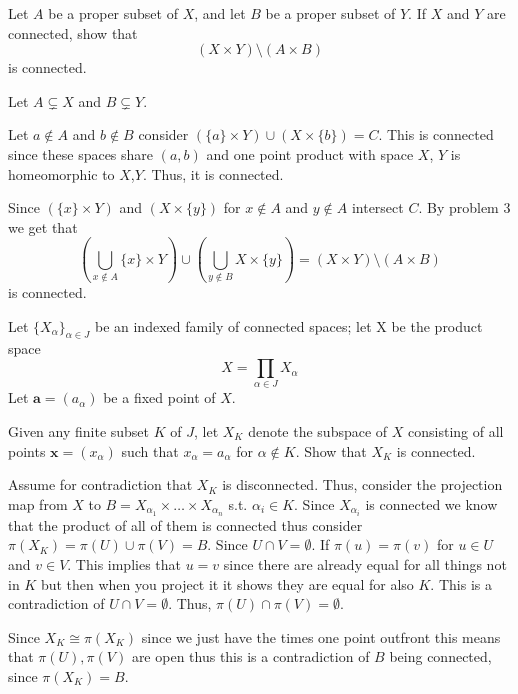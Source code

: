 \addtocounter{problemcounter}{2}
\vspace{1in}
\begin{pb}{}
    Let $A$ be a proper subset of $X$, and let  $B$ be a proper subset of $Y$. If $X$ and $Y$ are connected, show that 
    \[(X \times Y ) \setminus (A \times B)\] is connected.
\end{pb}
\begin{problemproof}
    Let $A \subsetneq X$ and $B \subsetneq Y$.

    Let $a \notin A$ and $b \notin B$ consider $(\{a\} \times Y) \cup (X \times \{b\})=C$. This is connected since these spaces share $(a,b)$ and one point product with space $X$, $Y$ is homeomorphic to $X$,$Y$. Thus, it is connected.

    Since $(\{x\} \times Y)$ and $(X \times \{y\})$ for $x \notin A$ and $y \notin A$ intersect $C$. By problem 3 we get that
    \[(\bigcup_{x \notin A}\{x\} \times Y) \cup (\bigcup_{y \notin B}X \times \{y\})=(X \times Y) \setminus (A \times B)\]
    is connected. 
\end{problemproof}

\vspace{1in}
\begin{pb}{}
    Let $\{X_\alpha\}_{\alpha \in J}$ be an indexed family of connected spaces; let X be the product space
    \[X = \prod_{\alpha \in J} X_\alpha\]
    Let $\mathbf{a} = (a_\alpha)$ be a fixed point of $X$. 
\end{pb}
\begin{subproblem}{}
    Given any finite subset $K$ of $J$, let $X_K$ denote the subspace of $X$ consisting
of all points $\mathbf{x} = (x_\alpha)$ such that $x_\alpha = a_\alpha$ for $\alpha \notin K$. Show that $X_K$ is
connected.
\end{subproblem}
\begin{problemproof}
    Assume for contradiction that $X_K$ is disconnected. Thus, consider the projection map from $X$ to $B=X_{\alpha_1} \times \dots \times X_{\alpha_n}$ s.t. $\alpha_i \in K$. Since $X_{\alpha_i}$ is connected we know that the product of all of them is connected thus consider $\pi(X_K)=\pi(U) \cup \pi(V)=B$. Since $U \cap V= \emptyset$. If $\pi(u)=\pi(v)$ for $u \in U$ and
    $v \in V$. This implies that $u=v$ since there are already equal for all things not in $K$ but then when you project it it shows they are equal for also $K$. This is a contradiction of $U \cap V = \emptyset$. Thus, $\pi(U) \cap \pi(V)= \emptyset$.

    Since $X_K \cong \pi(X_K)$ since we just have the times one point outfront this means that $\pi(U),\pi(V)$ are open thus this is a contradiction of $B$ being connected, since $\pi(X_K)= B$.
\end{problemproof}

